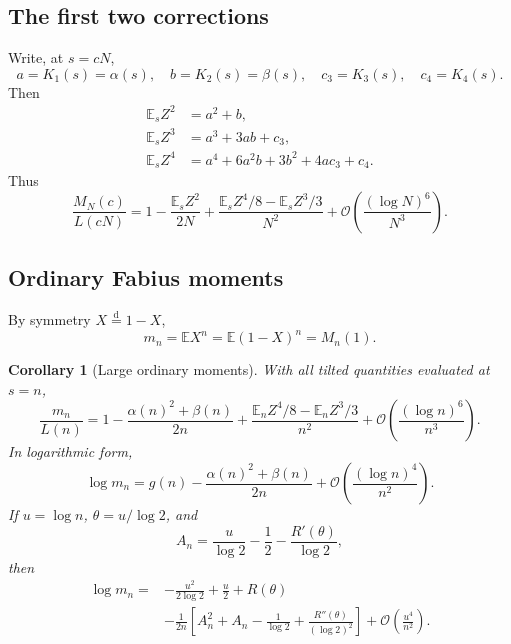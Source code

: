\documentclass[11pt,oneside]{article}
\newtheorem{corollary}[theorem]{Corollary}
\theoremstyle{definition}
\theoremstyle{remark}
\newcommand{\E}{\mathbb E}
\newcommand{\bigO}{\mathcal O}
\newcommand{\dist}{\mathrel{\stackrel{\mathrm d}=}}
\begin{document}
\subsection{The first two corrections}

Write, at $s=cN$,
\begin{equation}\label{eq:abcd}
 a=K_1(s)=\alpha(s),\quad b=K_2(s)=\beta(s),\quad
 c_3=K_3(s),\quad c_4=K_4(s).
\end{equation}
Then
\begin{align}
 \E_sZ^2&=a^2+b,\label{eq:raw2}\\
 \E_sZ^3&=a^3+3ab+c_3,\label{eq:raw3}\\
 \E_sZ^4&=a^4+6a^2b+3b^2+4ac_3+c_4.\label{eq:raw4}
\end{align}
Thus
\begin{equation}\label{eq:transfer-second}
 \frac{M_N(c)}{L(cN)}=
 1-\frac{\E_sZ^2}{2N}
 +\frac{\E_sZ^4/8-\E_sZ^3/3}{N^2}
 +\bigO\!\left(\frac{(\log N)^6}{N^3}\right).
\end{equation}

\subsection{Ordinary Fabius moments}

By symmetry $X\dist1-X$,
\begin{equation}\label{eq:mn-M}
 m_n=\E X^n=\E(1-X)^n=M_n(1).
\end{equation}

\begin{corollary}[Large ordinary moments]\label{cor:ordinary-moments}
With all tilted quantities evaluated at $s=n$,
\begin{equation}\label{eq:mn-second}
 \boxed{
 \frac{m_n}{L(n)}=
 1-\frac{\alpha(n)^2+\beta(n)}{2n}
 +\frac{\E_nZ^4/8-\E_nZ^3/3}{n^2}
 +\bigO\!\left(\frac{(\log n)^6}{n^3}\right).}
\end{equation}
In logarithmic form,
\begin{equation}\label{eq:logmn-first}
 \log m_n=g(n)-\frac{\alpha(n)^2+\beta(n)}{2n}
 +\bigO\!\left(\frac{(\log n)^4}{n^2}\right).
\end{equation}
If $u=\log n$, $\theta=u/\log2$, and
\begin{equation}\label{eq:An}
 A_n=\frac{u}{\log2}-\frac12-\frac{R'(\theta)}{\log2},
\end{equation}
then
\begin{align}
 \log m_n={}&-\frac{u^2}{2\log2}+\frac u2+R(\theta)\nonumber\\
 &-\frac1{2n}\left[
 A_n^2+A_n-\frac1{\log2}+\frac{R''(\theta)}{(\log2)^2}
 \right]
 +\bigO\!\left(\frac{u^4}{n^2}\right).
 \label{eq:logmn-R}
\end{align}
\end{corollary}
\end{document}
